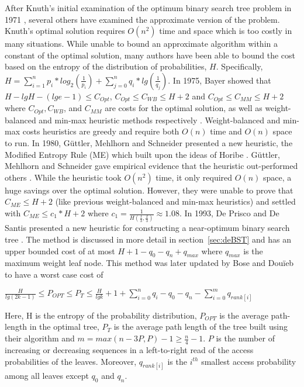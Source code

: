 \documentclass[letterpaper,12pt,titlepage,oneside,final]{book}
\theoremstyle{plain}
\begin{document}
After Knuth's initial examination of the optimum binary search tree problem in 1971 \cite{knuth1971optimum}, several others have examined the approximate version of the problem. Knuth's optimal solution requires $O(n^2)$ time and space which is too costly in many situations. While unable to bound an approximate algorithm within a constant of the optimal solution, many authors have been able to bound the cost based on the entropy of the distribution of probabilities, $H$. Specifically, $H = \sum_{i=1}^{n} p_i*log_2(\frac{1}{p_i}) + \sum_{j=0}^{n} q_i*lg(\frac{1}{q_j})$. In 1975, Bayer showed that $H-lg H-(lg e-1) \leq C_{Opt}$, $C_{Opt} \leq C_{WB} \leq H + 2$ and $C_{Opt} \leq C_{MM} \leq H + 2$ where $C_{Opt}, C_{WB}$, and $C_{MM}$ are costs for the optimal solution, as well as weight-balanced and min-max heuristic methods respectively \cite{bayer1975improved}. Weight-balanced and min-max costs heuristics are greedy and require both $O(n)$ time and $O(n)$ space to run. In 1980, G{\"u}ttler, Mehlhorn and Schneider presented a new heuristic, the Modified Entropy Rule (ME) \cite{guttler1980binary} which built upon the ideas of Horibe \cite{horibe1977improved}. G{\"u}ttler, Mehlhorn and Schneider gave empirical evidence that the heuristic out-performed others \cite{guttler1980binary}. While the heuristic took $O(n^2)$ time, it only required $O(n)$ space, a huge savings over the optimal solution. However, they were unable to prove that $C_{ME} \leq H+2$ (like previous weight-balanced and min-max heuristics) and settled with $C_{ME} \leq c_1*H+2$ where $c_1=\frac{1}{H(\frac{1}{3}, \frac{2}{3})} \approx 1.08$. In 1993, De Prisco and De Santis presented a new heuristic for constructing a near-optimum binary search tree \cite{de1993binary}. The method is discussed in more detail in section~\ref{sec:deBST} and has an upper bounded cost of at most $H+1-q_0-q_n+q_{max}$ where $q_{max}$ is the maximum weight leaf node. This method was later updated by Bose and Dou\"{i}eb to have a worst case cost of 
 \begin{center}
$\frac{H}{lg(2k-1)} \leq P_{OPT} \leq P_T \leq \frac{H}{lg k} + 1 + \sum_{i=0}^n q_i - q_0 - q_n - \sum_{i=0}^m q_{rank[i]}$ \cite{bose2009efficient}
\end{center}
Here, H is the entropy of the probability distribution, $P_{OPT}$ is the average path-length in the optimal tree, $P_T$ is the average path length of the tree built using their algorithm and $m=max({n-3P,P})-1 \geq \frac{n}{4} - 1$. $P$ is the number of increasing or decreasing sequences in a left-to-right read of the access probabilities of the leaves. Moreover, $q_{rank[i]}$ is the $i^{th}$ smallest access probability among all leaves except $q_0$ and $q_n$. \\ 
\end{document}
